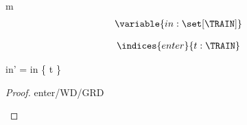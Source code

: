 \begin{machine}{m}
\newset{\TRAIN}
\begin{align*}
\variable{	in : \set[\TRAIN]}
\end{align*}



\begin{align*}
\indices{enter}{	t: \TRAIN}
\end{align*}

\begin{banana}
{	in' = in \bunion \{ t \} }
\end{banana}

\begin{proof}{enter/WD/GRD}
	\begin{calculation}
		\true
	\hint{=}{  }
		\true
	\end{calculation}
\end{proof}
\end{machine}
